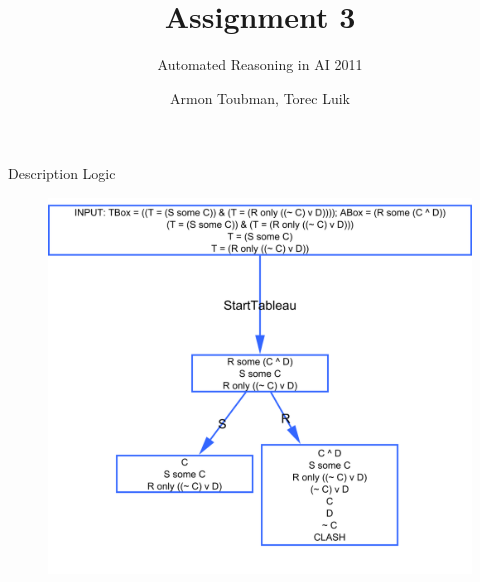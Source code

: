 \documentclass{beamer}
\title{Assignment 3}
\subtitle
{Automated Reasoning in AI 2011} %
\author{Armon Toubman, Torec Luik}
\begin{document}
\begin{frame}
  \titlepage
\end{frame}






\begin{frame}{Description Logic}

\begin{figure}[htbp]
\begin{center}
\includegraphics[scale=0.2]{figure1.png}
\end{center}
\end{figure}

\end{frame}
\end{document}
